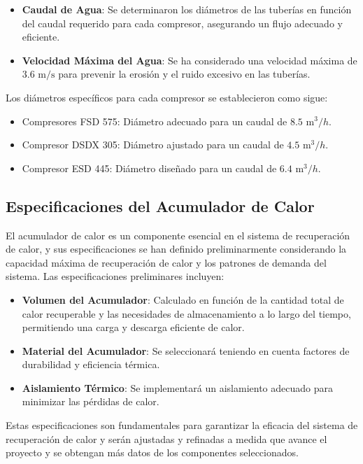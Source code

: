 \documentclass[11pt,a4paper]{article}  %
\begin{document}
\begin{itemize}
    \item \textbf{Caudal de Agua}: Se determinaron los diámetros de las tuberías en función del caudal requerido para cada compresor, asegurando un flujo adecuado y eficiente.
    \item \textbf{Velocidad Máxima del Agua}: Se ha considerado una velocidad máxima de \(3.6 \text{ m/s}\) para prevenir la erosión y el ruido excesivo en las tuberías.
\end{itemize}

Los diámetros específicos para cada compresor se establecieron como sigue:
\begin{itemize}
    \item Compresores FSD 575: Diámetro adecuado para un caudal de \(8.5 \text{ m}^3/h\).
    \item Compresor DSDX 305: Diámetro ajustado para un caudal de \(4.5 \text{ m}^3/h\).
    \item Compresor ESD 445: Diámetro diseñado para un caudal de \(6.4 \text{ m}^3/h\).
\end{itemize}

\subsection{Especificaciones del Acumulador de Calor}
El acumulador de calor es un componente esencial en el sistema de recuperación de calor, y sus especificaciones se han definido preliminarmente considerando la capacidad máxima de recuperación de calor y los patrones de demanda del sistema. Las especificaciones preliminares incluyen:

\begin{itemize}
    \item \textbf{Volumen del Acumulador}: Calculado en función de la cantidad total de calor recuperable y las necesidades de almacenamiento a lo largo del tiempo, permitiendo una carga y descarga eficiente de calor.
    \item \textbf{Material del Acumulador}: Se seleccionará teniendo en cuenta factores de durabilidad y eficiencia térmica.
    \item \textbf{Aislamiento Térmico}: Se implementará un aislamiento adecuado para minimizar las pérdidas de calor.
\end{itemize}

Estas especificaciones son fundamentales para garantizar la eficacia del sistema de recuperación de calor y serán ajustadas y refinadas a medida que avance el proyecto y se obtengan más datos de los componentes seleccionados.
\end{document}
